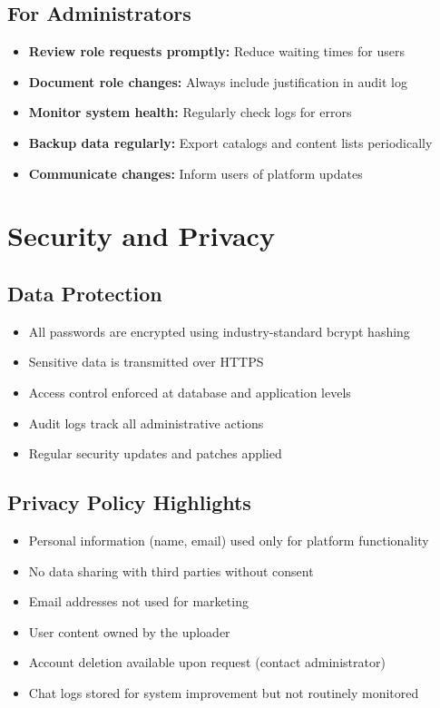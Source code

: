 \documentclass[12pt,a4paper]{article}
\begin{document}
\subsection{For Administrators}
\begin{itemize}[leftmargin=*]
    \item \textbf{Review role requests promptly:} Reduce waiting times for users
    \item \textbf{Document role changes:} Always include justification in audit log
    \item \textbf{Monitor system health:} Regularly check logs for errors
    \item \textbf{Backup data regularly:} Export catalogs and content lists periodically
    \item \textbf{Communicate changes:} Inform users of platform updates
\end{itemize}

\section{Security and Privacy}

\subsection{Data Protection}
\begin{itemize}[leftmargin=*]
    \item All passwords are encrypted using industry-standard bcrypt hashing
    \item Sensitive data is transmitted over HTTPS
    \item Access control enforced at database and application levels
    \item Audit logs track all administrative actions
    \item Regular security updates and patches applied
\end{itemize}

\subsection{Privacy Policy Highlights}
\begin{itemize}[leftmargin=*]
    \item Personal information (name, email) used only for platform functionality
    \item No data sharing with third parties without consent
    \item Email addresses not used for marketing
    \item User content owned by the uploader
    \item Account deletion available upon request (contact administrator)
    \item Chat logs stored for system improvement but not routinely monitored
\end{itemize}
\end{document}

